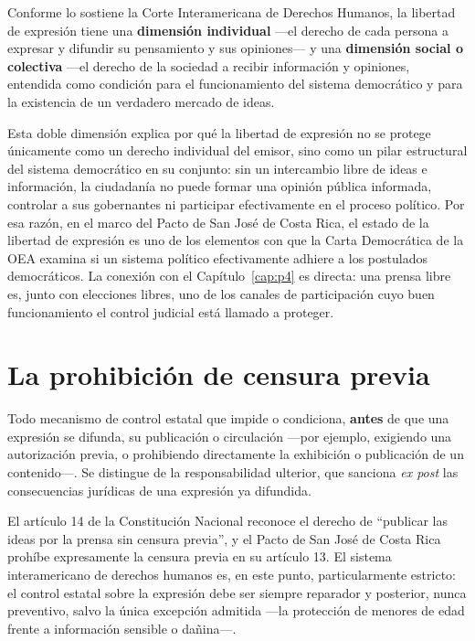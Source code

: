 \documentclass[12pt,oneside]{book}
\begin{document}
\begin{defbox}
Conforme lo sostiene la Corte Interamericana de Derechos Humanos, la libertad de
expresión tiene una \textbf{dimensión individual} —el derecho de cada persona a
expresar y difundir su pensamiento y sus opiniones— y una \textbf{dimensión
social o colectiva} —el derecho de la sociedad a recibir información y opiniones,
entendida como condición para el funcionamiento del sistema democrático y para la
existencia de un verdadero mercado de ideas.
\end{defbox}

Esta doble dimensión explica por qué la libertad de expresión no se protege
únicamente como un derecho individual del emisor, sino como un pilar
estructural del sistema democrático en su conjunto: sin un intercambio libre de
ideas e información, la ciudadanía no puede formar una opinión pública informada,
controlar a sus gobernantes ni participar efectivamente en el proceso político.
Por esa razón, en el marco del Pacto de San José de Costa Rica, el estado de la
libertad de expresión es uno de los elementos con que la Carta Democrática de la
OEA examina si un sistema político efectivamente adhiere a los postulados
democráticos. La conexión con el Capítulo~\ref{cap:p4} es directa: una prensa
libre es, junto con elecciones libres, uno de los canales de participación cuyo
buen funcionamiento el control judicial está llamado a proteger.

\section{La prohibición de censura previa}

\begin{defbox}
Todo mecanismo de control estatal que impide o condiciona, \textbf{antes} de que
una expresión se difunda, su publicación o circulación —por ejemplo, exigiendo una
autorización previa, o prohibiendo directamente la exhibición o publicación de un
contenido—. Se distingue de la responsabilidad ulterior, que sanciona \textit{ex
post} las consecuencias jurídicas de una expresión ya difundida.
\end{defbox}

El artículo 14 de la Constitución Nacional reconoce el derecho de ``publicar las
ideas por la prensa sin censura previa'', y el Pacto de San José de Costa Rica
prohíbe expresamente la censura previa en su artículo 13. El sistema
interamericano de derechos humanos es, en este punto, particularmente estricto: el
control estatal sobre la expresión debe ser siempre reparador y posterior, nunca
preventivo, salvo la única excepción admitida —la protección de menores de edad
frente a información sensible o dañina—.
\end{document}
